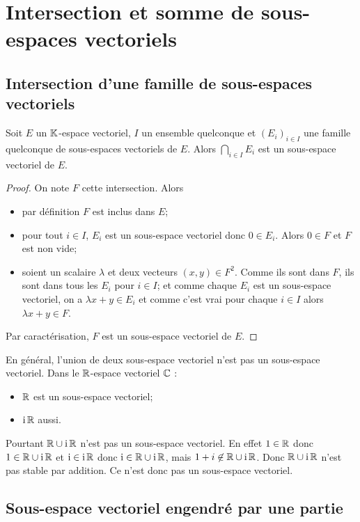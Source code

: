\section{Intersection et somme de sous-espaces vectoriels}

\subsection{Intersection d'une famille de sous-espaces vectoriels}

\begin{theo}
  Soit \(E\) un \(\mathbb{K}\)-espace vectoriel, \(I\) un ensemble quelconque et \((E_i)_{i \in I}\) une famille quelconque de sous-espaces vectoriels de \(E\). Alors \(\bigcap_{i \in I} E_i\) est un sous-espace vectoriel de \(E\).
\end{theo}
\begin{proof}
  On note \(F\) cette intersection. Alors
  \begin{itemize}
  \item par définition \(F\) est inclus dans \(E\);
  \item pour tout \(i \in I\), \(E_i\) est un sous-espace vectoriel donc \(0 \in E_i\). Alors \(0 \in F\) et \(F\) est non vide;
  \item soient un scalaire \(\lambda\) et deux vecteurs \((x,y) \in F^2\). Comme ils sont dans \(F\), ils sont dans tous les \(E_i\) pour \(i \in I\); et comme chaque \(E_i\) est un sous-espace vectoriel, on a \(\lambda x +y \in E_i\) et comme c'est vrai pour chaque \(i \in I\) alors \(\lambda x +y \in F\).
  \end{itemize}
  Par caractérisation, \(F\) est un sous-espace vectoriel de \(E\).
\end{proof}
%
En général, l'union de deux sous-espace vectoriel n'est pas un sous-espace vectoriel. Dans le \(\mathbb{R}\)-espace vectoriel \(\mathbb{C}\) :
\begin{itemize}
\item \(\mathbb{R}\) est un sous-espace vectoriel;
\item \(\operatorname{i}\mathbb{R}\) aussi.
\end{itemize}
Pourtant \(\mathbb{R} \cup \operatorname{i}\mathbb{R}\) n'est pas un sous-espace vectoriel. En effet \(1 \in \mathbb{R}\) donc \(1 \in \mathbb{R} \cup \operatorname{i}\mathbb{R}\) et \(\operatorname{i} \in \operatorname{i}\mathbb{R}\) donc \(\operatorname{i} \in \mathbb{R}\cup \operatorname{i}\mathbb{R}\), mais \(1+i \not\in \mathbb{R}\cup\operatorname{i}\mathbb{R}\). Donc \(\mathbb{R}\cup\operatorname{i}\mathbb{R}\) n'est pas stable par addition. Ce n'est donc pas un sous-espace vectoriel.

\subsection{Sous-espace vectoriel engendré par une partie}

